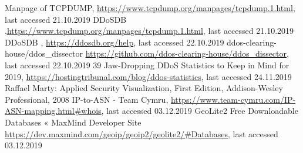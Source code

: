 \begin{thebibliography}{99}
 Manpage of TCPDUMP, \url{https://www.tcpdump.org/manpages/tcpdump.1.html}, last accessed 21.10.2019
 DDoSDB ,\url{https://www.tcpdump.org/manpages/tcpdump.1.html}, last accessed 21.10.2019
 DDoSDB , \url{https://ddosdb.org/help}, last accessed 22.10.2019
 ddos-clearing-house/ddos\_dissector \url{https://github.com/ddos-clearing-house/ddos_dissector}, last accessed 22.10.2019
 39 Jaw-Dropping DDoS Statistics to Keep in Mind for 2019, \url{https://hostingtribunal.com/blog/ddos-statistics}, last accessed 24.11.2019
 Raffael Marty: Applied Security Visualization, First Edition, Addison-Wesley Professional, 2008
 IP-to-ASN - Team Cymru, \url{https://www.team-cymru.com/IP-ASN-mapping.html#whois}, last accessed 03.12.2019
 GeoLite2 Free Downloadable Databases « MaxMind Developer Site \url{https://dev.maxmind.com/geoip/geoip2/geolite2/#Databases}, last accessed 03.12.2019

\end{thebibliography}

